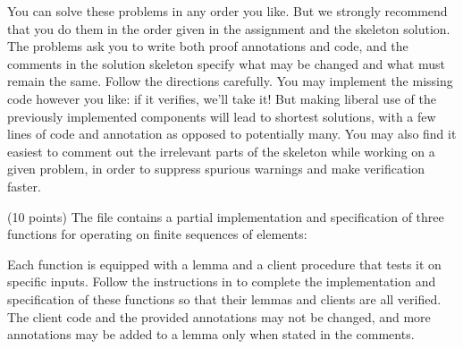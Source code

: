\documentclass{handout}
\begin{document}
You can solve these problems in any order you like.  But we strongly recommend
that you do them in the order given in the assignment and the skeleton solution.
The problems ask you to write both proof annotations and code, and the comments
in the solution skeleton specify what may be changed and what must remain the
same.  Follow the directions carefully. You may implement the missing code
however you like: if it verifies, we'll take it!  But making liberal use of the
previously implemented components will lead to shortest solutions, with a few
lines of code and annotation as opposed to potentially many. You may also find
it easiest to comment out the irrelevant parts of the skeleton while working on
a given problem, in order to suppress spurious warnings and make verification
faster.

\begin{questions}

\item (10 points) \label{prob:dafny-first} The file  
contains a partial implementation and specification of three functions for
operating on finite sequences of elements:


Each function is equipped with a lemma and a client procedure that tests it on
specific inputs. Follow the instructions in   to complete
the implementation and specification of these functions so that their lemmas and
clients are all verified.  The client code and the provided annotations may not
be changed, and more annotations may be added to a lemma only when stated in the
comments.




\end{questions}
\end{document}
